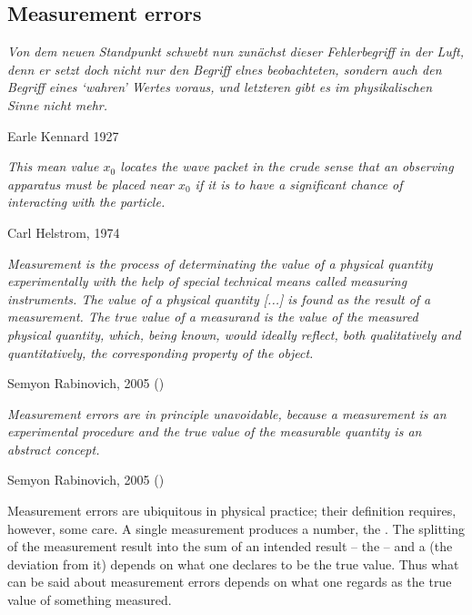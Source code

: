 \documentclass[12pt]{article}
\begin{document}
\subsection{Measurement errors}\label{ss.measErr}

\nopagebreak
\hfill\parbox[t]{10.8cm}{\footnotesize

{\em
Von dem neuen Standpunkt
schwebt nun zun\"achst dieser Fehlerbegriff in der Luft, denn er setzt
doch nicht nur den Begriff elnes beobachteten, sondern auch den
Begriff eines `wahren' Wertes voraus, und letzteren gibt es im
physikalischen Sinne nicht mehr.}

\hfill Earle Kennard 1927 \cite[p.340]{Ken}
}

\bigskip


\nopagebreak
\hfill\parbox[t]{10.8cm}{\footnotesize

{\em This mean value $x_0$ locates the wave packet in the crude sense
that an observing apparatus must be placed near $x_0$ if it is to have
a significant chance of interacting with the particle.}

\hfill Carl Helstrom, 1974 \cite[p.454]{Hel74}
}

\bigskip


\nopagebreak
\hfill\parbox[t]{10.8cm}{\footnotesize

{\em Measurement is the process of determinating the value of a physical
quantity experimentally with the help of special technical means called
measuring instruments. The value of a physical quantity [...] is found 
as the result of a measurement.
The true value of a measurand is the value of the measured physical
quantity, which, being known, would ideally reflect, both qualitatively
and quantitatively, the corresponding property of the object.}

\hfill Semyon Rabinovich, 2005 (\cite[p.1f]{Rab})
}

\bigskip


\nopagebreak
\hfill\parbox[t]{10.8cm}{\footnotesize

{\em Measurement errors are in principle unavoidable, because a
measurement is an experimental procedure and the true value of the
measurable quantity is an abstract concept. }

\hfill Semyon Rabinovich, 2005 (\cite[p.11]{Rab})
}

\bigskip


Measurement errors are ubiquitous in physical practice; their
definition requires, however, some care. A single measurement produces
a number, the . The splitting of the measurement
result into the sum of an intended result -- the  -- and
a  (the deviation from it) depends on what one
declares to be the true value. Thus what can be said about measurement
errors depends on what one regards as the true value of something
measured.
\end{document}
